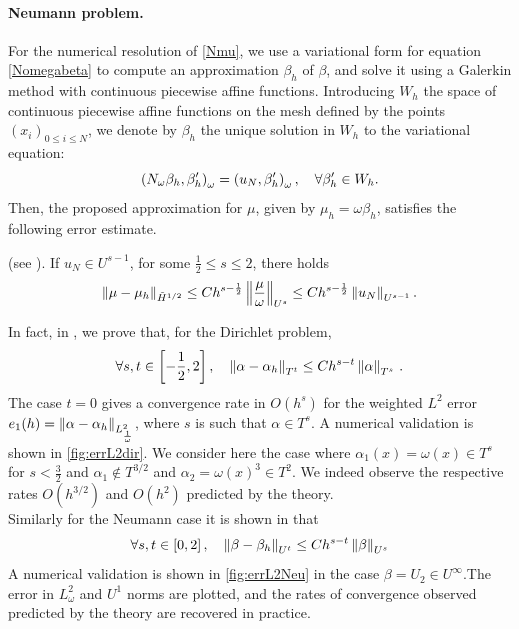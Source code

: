 \documentclass[a4paper]{article}
\begin{document}
\paragraph{Neumann problem.} For the numerical resolution of \eqref{Nmu}, we use a variational form for equation \eqref{Nomegabeta} to compute an approximation $\beta_h$ of $\beta$, and solve 
it using a Galerkin method with continuous piecewise affine functions. Introducing $W_h$ the space of continuous piecewise affine functions on the mesh
defined by the points $(x_i)_{0\leq i\leq N}$, we denote by $\beta_h$ the unique solution in $W_h$ to the variational equation:
\begin{equation}
\left( N_\omega \beta_h,\beta_h'\right)_{\omega} = \left( u_N,\beta_h'\right)_{\omega}, \quad \forall \beta_h' \in W_h.
\label{NomegaBetaGalerk}
\end{equation}
Then, the proposed approximation for $\mu$, given by $\mu_h = \omega \beta_h$, satisfies the following error estimate. 
\begin{theorem}(see \cite{averseng}).
	If $u_N \in U^{s-1}$, for some $\frac{1}{2} \leq s \leq 2$, there holds 
	\[\left\|\mu - \mu_h\right\|_{\tilde{H}^{1/2}} \leq C h^{s - \frac{1}{2}}\left\|\frac{\mu}{\omega}\right\|_{U^{s}}\leq C h^{s - \frac{1}{2}}\left\|u_N\right\|_{U^{s-1}}.\]
	\label{theOrdreCVNeumann}
\end{theorem}
In fact, in \cite{averseng}, we prove that, for the Dirichlet problem,
\[\forall s,t \in \left[-\frac{1}{2},2\right], \quad \left\|\alpha - \alpha_h\right\|_{T^t} \leq C h^{s - t}\left\|\alpha\right\|_{T^s}\,.\] 
The case $t = 0$ gives a convergence rate in $O(h^s)$ for the weighted $L^2 $ error $e_1(h) = \left\|\alpha - \alpha_h\right\|_{L^2_\frac{1}{\omega}}$, where $s$ is such that $\alpha \in T^s$. A numerical validation is shown in \autoref{fig:errL2dir}. We consider here the case where $\alpha_1(x) = \omega(x) \in T^{s}$ for $s < \frac{3}{2}$ and $\alpha_1 \notin T^{3/2}$ and $\alpha_2 = \omega(x)^3 \in T^2$. We indeed observe the respective rates $O(h^{3/2})$ and $O(h^2)$ predicted by the theory. \\
Similarly for the Neumann case it is shown in \cite{averseng} that
\begin{equation}
\forall s,t \in\left[0, 2\right], \quad \left\|\beta - \beta_h\right\|_{U^t} \leq Ch^{s - t}\left\|\beta\right\|_{U^s}
\label{estimUsUt}
\end{equation} 
A numerical validation is shown in \autoref{fig:errL2Neu} in the case $\beta = U_2 \in U^{\infty}$.The error in $L^2_\omega$ and $U^1$ norms are plotted, and the rates of convergence observed predicted by the theory are recovered in practice. 
\end{document}

